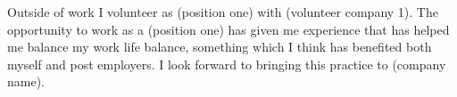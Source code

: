 Outside of work I volunteer as (position one) with (volunteer company 1). The opportunity to work as a (position one) has given me experience that has helped me balance my work life balance, something which I think has benefited both myself and post employers. I look forward to bringing this practice to (company name).